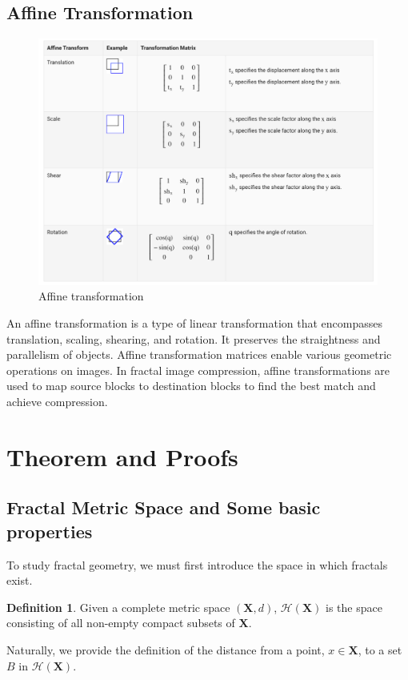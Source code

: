 \documentclass[a4paper,11pt, titlepage]{article}
\theoremstyle{definition}
\newtheorem{definition}{Definition}[section]
\theoremstyle{plain}
\theoremstyle{remark}
\theoremstyle{definition}
\begin{document}
\subsection{Affine Transformation}
\begin{figure}[ht]
    \centering
    \includegraphics[width=0.9\linewidth]{pic4.png}
    \caption{Affine transformation\cite{mathworksTransformations}}
    \label{fig:pic4}
\end{figure}
An affine transformation is a type of linear transformation that encompasses translation, scaling, shearing, and rotation. It preserves the straightness and parallelism of objects. Affine transformation matrices enable various geometric operations on images. In fractal image compression, affine transformations are used to map source blocks to destination blocks to find the best match and achieve compression. 

\section{Theorem and Proofs}
\subsection{Fractal Metric Space and Some basic properties}
To study fractal geometry, we must first introduce the space in which fractals exist.
\begin{definition}
Given a complete metric space $(\mathbf{X}, d)$, $\mathcal{H}(\mathbf{X})$ is the space consisting of all non-empty compact subsets of $\mathbf{X}$.
\end{definition}

Naturally, we provide the definition of the distance from a point, $x \in \mathbf{X}$, to a set $B$ in $\mathcal{H}(\mathbf{X})$.
\end{document}
